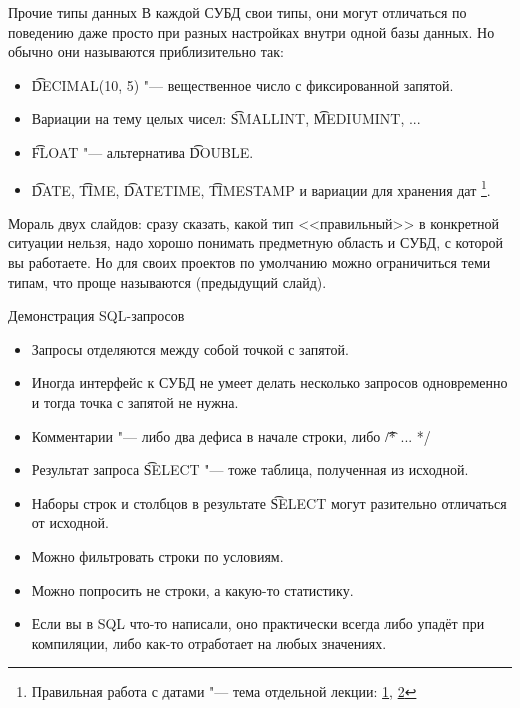 \begin{frame}{Прочие типы данных}
	В каждой СУБД свои типы, они могут отличаться по поведению даже просто при разных настройках внутри одной базы данных.
	Но обычно они называются приблизительно так:

	\begin{itemize}
		\item \t{DECIMAL(10, 5)} "--- вещественное число с фиксированной запятой.
		\item Вариации на тему целых чисел: \t{SMALLINT}, \t{MEDIUMINT}, ...
		\item \t{FLOAT} "--- альтернатива \t{DOUBLE}.
		\item \t{DATE}, \t{TIME}, \t{DATETIME}, \t{TIMESTAMP} и вариации для хранения дат
			\footnote{Правильная работа с датами "--- тема отдельной лекции: \href{https://habrahabr.ru/post/146109/}{1}, \href{https://habrahabr.ru/company/mailru/blog/242645/}{2}}.
	\end{itemize}

	Мораль двух слайдов: сразу сказать, какой тип <<правильный>> в конкретной ситуации нельзя,
	надо хорошо понимать предметную область и СУБД, с которой вы работаете.
	Но для своих проектов по умолчанию можно ограничиться теми типам, что проще называются (предыдущий слайд).
\end{frame}

\begin{frame}{Демонстрация SQL-запросов}
	\begin{itemize}
		\item Запросы отделяются между собой точкой с запятой.
		\item Иногда интерфейс к СУБД не умеет делать несколько запросов одновременно и тогда точка с запятой не нужна.
		\item Комментарии "--- либо два дефиса в начале строки, либо \t{/* ... */}
		\item Результат запроса \t{SELECT} "--- тоже таблица, полученная из исходной.
		\item Наборы строк и столбцов в результате \t{SELECT} могут разительно отличаться от исходной.
		\item Можно фильтровать строки по условиям.
		\item Можно попросить не строки, а какую-то статистику.
		\item Если вы в SQL что-то написали, оно практически всегда либо упадёт при компиляции, либо как-то отработает на любых значениях.
	\end{itemize}
\end{frame}

